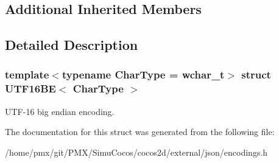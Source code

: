 \subsection*{Additional Inherited Members}


\subsection{Detailed Description}
\subsubsection*{template$<$typename Char\+Type = wchar\+\_\+t$>$\newline
struct U\+T\+F16\+B\+E$<$ Char\+Type $>$}

U\+T\+F-\/16 big endian encoding. 

The documentation for this struct was generated from the following file\+:\begin{DoxyCompactItemize}
\item 
/home/pmx/git/\+P\+M\+X/\+Simu\+Cocos/cocos2d/external/json/encodings.\+h\end{DoxyCompactItemize}
